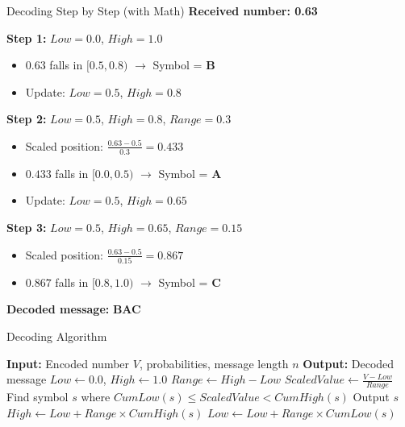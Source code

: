 \documentclass[aspectratio=169,12pt]{beamer}
\begin{document}
\begin{frame}{Decoding Step by Step (with Math)}
    \textbf{Received number: 0.63}
    
    \vspace{0.3cm}
    \textbf{Step 1:} $Low = 0.0$, $High = 1.0$
    \begin{itemize}
        \item $0.63$ falls in $[0.5, 0.8)$ $\rightarrow$ Symbol = \textbf{B}
        \item Update: $Low = 0.5$, $High = 0.8$
    \end{itemize}
    
    \vspace{0.3cm}
    \textbf{Step 2:} $Low = 0.5$, $High = 0.8$, $Range = 0.3$
    \begin{itemize}
        \item Scaled position: $\frac{0.63 - 0.5}{0.3} = 0.433$
        \item $0.433$ falls in $[0.0, 0.5)$ $\rightarrow$ Symbol = \textbf{A}
        \item Update: $Low = 0.5$, $High = 0.65$
    \end{itemize}
    
    \vspace{0.3cm}
    \textbf{Step 3:} $Low = 0.5$, $High = 0.65$, $Range = 0.15$
    \begin{itemize}
        \item Scaled position: $\frac{0.63 - 0.5}{0.15} = 0.867$
        \item $0.867$ falls in $[0.8, 1.0)$ $\rightarrow$ Symbol = \textbf{C}
    \end{itemize}
    
    \vspace{0.3cm}
    \textbf{Decoded message:} \textbf{BAC} \checkmark
\end{frame}

\begin{frame}{Decoding Algorithm}
    \begin{algorithm}[H]
        \caption{Arithmetic Decoding}
        \begin{algorithmic}[1]
            \STATE \textbf{Input:} Encoded number $V$, probabilities, message length $n$
            \STATE \textbf{Output:} Decoded message
            \STATE $Low \leftarrow 0.0$, $High \leftarrow 1.0$
                \STATE $Range \leftarrow High - Low$
                \STATE $ScaledValue \leftarrow \frac{V - Low}{Range}$
                \STATE Find symbol $s$ where $CumLow(s) \leq ScaledValue < CumHigh(s)$
                \STATE Output $s$
                \STATE $High \leftarrow Low + Range \times CumHigh(s)$
                \STATE $Low \leftarrow Low + Range \times CumLow(s)$
            \ENDFOR
        \end{algorithmic}
    \end{algorithm}
\end{frame}
\end{document}
